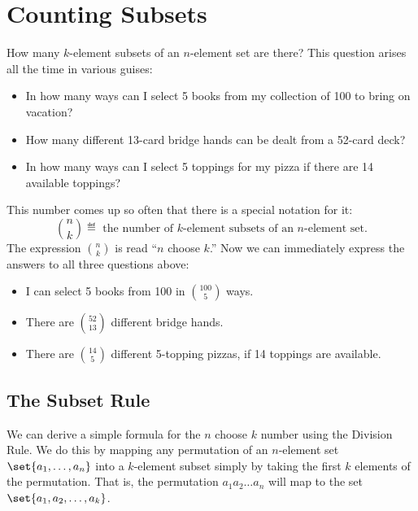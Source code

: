 \begin{problems}
\homeworkproblems
{}
\end{problems}

\section{Counting Subsets}\label{combinations_sec}

How many $k$-element subsets of an $n$-element set are there?  This
question arises all the time in various guises:

\begin{itemize}

\item In how many ways can I select 5 books from my collection of 100
to bring on vacation?

\item How many different 13-card bridge hands can be dealt from a
52-card deck?

\item In how many ways can I select 5 toppings for my pizza if there
are 14 available toppings?

\end{itemize}

This number comes up so often that there is a special notation for it:
\[
\binom{n}{k} \eqdef \text{ the number of $k$-element subsets of an $n$-element set.}
\]
The expression $\binom{n}{k}$ is read ``$n$ choose $k$.''  Now we can
immediately express the answers to all three questions above:

\begin{itemize}

\item I can select 5 books from 100 in $\binom{100}{5}$ ways.

\item There are $\binom{52}{13}$ different bridge hands.

\item There are $\binom{14}{5}$ different 5-topping pizzas, if 14
toppings are available.

\end{itemize}

\subsection{The Subset Rule}

We can derive a simple formula for the $n$ choose $k$ number using the
Division Rule.  We do this by mapping any permutation of an $n$-element
set $\set{a_1,\dots, a_n}$ into a $k$-element subset simply by taking the
first $k$ elements of the permutation.  That is, the permutation
$a_1a_2\dots a_n$ will map to the set $\set{a_1,a_2,\dots,a_k}$.

